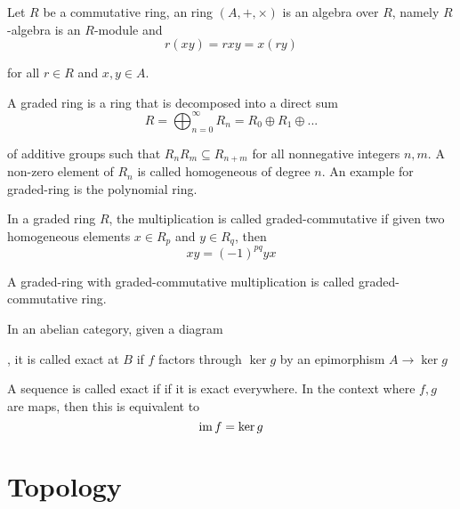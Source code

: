 \begin{definition}
	Let $R$ be a commutative ring, an ring $(A, +, \times)$ is an algebra over $R$, namely $R$-algebra is an $R$-module and 
	$$
		r(xy) = rxy = x (ry)
	$$
	
	for all $r \in R$ and $x, y \in A$.
\end{definition}

\begin{definition}
	A graded ring is a ring that is decomposed into a direct sum
	$$
		R = \bigoplus_{n=0}^\infty R_n = R_0 \oplus R_1 \oplus ...
	$$
	
	of additive groups such that $R_n R_m \subseteq R_{n + m}$ for all nonnegative integers $n, m$. A non-zero element of $R_n$ is called homogeneous of degree $n$. An example for graded-ring is the polynomial ring.
\end{definition}

\begin{definition}
	In a graded ring $R$, the multiplication is called graded-commutative if given two homogeneous elements $x \in R_p$ and $y \in R_q$, then
	$$
		xy = (-1)^{pq} yx
	$$
	
	A graded-ring with graded-commutative multiplication is called graded-commutative ring.
\end{definition}

\begin{definition}
	In an abelian category, given a diagram , it is called exact at $B$ if $f$ factors through $\ker g$ by an epimorphism $A \to \ker g$
	\begin{center}
	\end{center}
	A sequence is called exact if if it is exact everywhere. In the context where $f, g$ are maps, then this is equivalent to
	$$
	\operatorname{im} f = \ker g
	$$
\end{definition}

\section{Topology}

